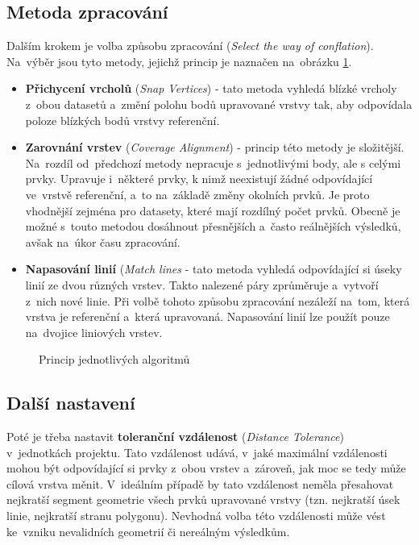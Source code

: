 \subsection{Metoda zpracování}
Dalším krokem je volba způsobu zpracování (\textit{Select the way of conflation}). 
Na~výběr jsou tyto metody, jejichž princip je naznačen na~obrázku \ref{fig:algorithms}.

\begin{itemize}
 \item \textbf{Přichycení vrcholů} (\textit{Snap Vertices}) - tato metoda vyhledá 
	blízké vrcholy z~obou datasetů a~změní polohu bodů upravované vrstvy tak, 
	aby odpovídala poloze blízkých bodů vrstvy referenční.
 \item \textbf{Zarovnání vrstev} (\textit{Coverage Alignment}) - princip této 
	metody je složitější. Na~rozdíl od~předchozí metody nepracuje s~jednotlivými
	body, ale s celými prvky. Upravuje i~některé prvky, k nimž neexistují 
	žádné odpovídající ve~vrstvě refe\-renční, a~to na~základě změny okolních 
	prvků. Je proto vhodnější zejména pro datasety, které mají rozdílný počet
	prvků. Obecně je možné s~touto metodou dosáhnout přesnějších a~často
	reálnějších výsledků, avšak na~úkor času zpraco\-vání.
 \item \textbf{Napasování linií} (\textit{Match lines} - tato metoda vyhledá
	odpovídající si úseky linií ze dvou různých vrstev. Takto nalezené
	páry zprůměruje a~vytvoří z~nich nové linie. Při volbě tohoto způsobu
	zpracování nezáleží na~tom, která vrstva je referenční a~která upravovaná.
	Napasování linií lze použít pouze na~dvojice liniových vrstev.
\end{itemize}

  \begin{figure}[H]
    \centering
      \def\svgwidth{400pt}
      
      \caption{Princip jednotlivých algoritmů}
      \label{fig:algorithms}
  \end{figure}

\subsection{Další nastavení}
Poté je třeba nastavit \textbf{toleranční vzdálenost} (\textit{Distance 
Tolerance}) v~jednotkách projektu. Tato vzdálenost udává, v~jaké maximální 
vzdálenosti mohou být odpovídající si prvky z~obou vrstev a~zároveň, jak 
moc se tedy může cílová vrstva měnit. V~ideálním případě by tato vzdálenost 
neměla přesahovat nejkratší segment geometrie všech prvků upravované vrstvy 
(tzn. nejkratší úsek linie, nejkratší stranu polygonu). Nevhodná volba této 
vzdálenosti může vést ke~vzniku nevalidních geometrií či nereálným výsledkům.

